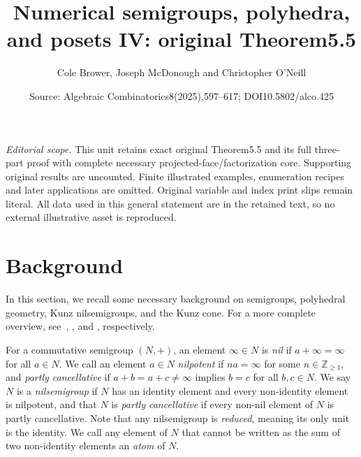 \documentclass[10pt,a4paper]{amsart}
\title[Kunz fan chamber incidence]{Numerical semigroups, polyhedra, and posets IV: original Theorem5.5}
\author{Cole Brower, Joseph McDonough and Christopher O'Neill}
\date{Source: Algebraic Combinatorics8(2025),597--617; DOI10.5802/alco.425}
\newcommand\ZZ{\mathbb{Z}}
\theoremstyle{definition}\newtheorem{defi}[thm]{Definition}
\begin{document}
\maketitle
\noindent\textit{Editorial scope.} This unit retains exact original Theorem5.5 and its full three-part proof with complete necessary projected-face/factorization core. Supporting original results are uncounted. Finite illustrated examples, enumeration recipes and later applications are omitted. Original variable and index print slips remain literal. All data used in this general statement are in the retained text, so no external illustrative asset is reproduced.
\setcounter{section}{1}
\section{Background}
\label{sec:background}

In this section, we recall some necessary background on semigroups, polyhedral geometry, Kunz nilsemigroups, and the Kunz cone. For a more complete overview, see~\cite{numericalappl}, \cite{ziegler}, \cite[Section~2]{minprescard} and \cite[Section~3]{kunzfaces3}, respectively.  

For a commutative semigroup $(N, +)$, an element $\infty\in N$ is \emph{nil} if $a + \infty = \infty$ for all $a \in N$. We call an element $a \in N$ \emph{nilpotent} if $na = \infty$ for some $n \in \ZZ_{\geq 1}$, and \emph{partly cancellative} if $a + b = a + c \ne \infty$ implies $b = c$ for all $b,c \in N$. We say $N$ is a \emph{nilsemigroup} if $N$ has an identity element and every non-identity element is nilpotent, and that $N$ is \emph{partly cancellative} if every non-nil element of $N$ is partly cancellative.  Note that any nilsemigroup is \emph{reduced}, meaning its only unit is the identity.  We call any element of $N$ that cannot be written as the sum of two non-identity elements an \emph{atom} of $N$. 
\end{document}
